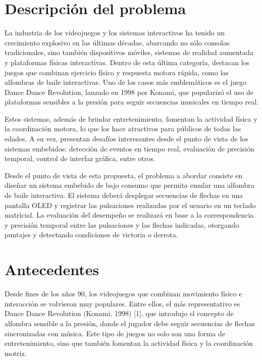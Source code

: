 \documentclass[a4paper,12pt]{article}
\begin{document}
\begin{linenumbers}
  \newpage
  \section{Descripción del problema}
  \label{sec:descripcion}
  La industria de los videojuegos y los sistemas interactivos ha tenido un crecimiento explosivo en las últimas décadas, abarcando no sólo consolas tradicionales, sino también dispositivos móviles, sistemas de realidad aumentada y plataformas físicas interactivas. Dentro de esta última categoría, destacan los juegos que combinan ejercicio físico y respuesta motora rápida, como las alfombras de baile interactivas. Uno de los casos más emblemáticos es el juego Dance Dance Revolution, lanzado en 1998 por Konami, que popularizó el uso de plataformas sensibles a la presión para seguir secuencias musicales en tiempo real.

  Estos sistemas, además de brindar entretenimiento, fomentan la actividad física y la coordinación motora, lo que los hace atractivos para públicos de todas las edades. A su vez, presentan desafíos interesantes desde el punto de vista de los sistemas embebidos: detección de eventos en tiempo real, evaluación de precisión temporal, control de interfaz gráfica, entre otros.

  Desde el punto de vista de esta propuesta, el problema a abordar consiste en diseñar un sistema embebido de bajo consumo que permita emular una alfombra de baile interactiva. El sistema deberá desplegar secuencias de flechas en una pantalla OLED y registrar las pulsaciones realizadas por el usuario en un teclado matricial. La evaluación del desempeño se realizará en base a la correspondencia y precisión temporal entre las pulsaciones y las flechas indicadas, otorgando puntajes y detectando condiciones de victoria o derrota.
  
  \section{Antecedentes}
  \label{sec:Antecedentes}
  
  Desde fines de los años 90, los videojuegos que combinan movimiento físico e interacción se volvieron muy populares. Entre ellos, el más representativo es Dance Dance Revolution (Konami, 1998) [1], que introdujo el concepto de alfombra sensible a la presión, donde el jugador debe seguir secuencias de flechas sincronizadas con música. Este tipo de juegos no solo son una forma de entretenimiento, sino que también fomentan la actividad física y la coordinación motriz.


\end{linenumbers}
\end{document}
